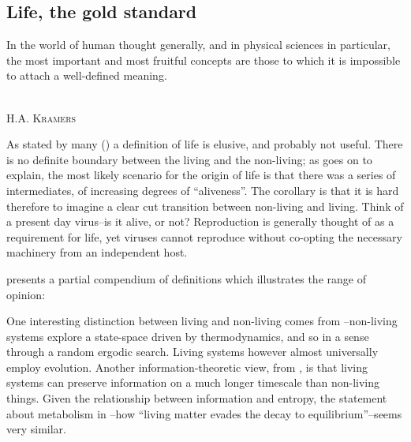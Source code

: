 \subsection{Life, the gold standard}

\epigraph{%
In the world of human thought generally, and in physical sciences in particular, the most important and most fruitful concepts are those to which it is impossible to attach a well-defined meaning.}%
{\textsc{\\H.A. Kramers}}


As stated by many (\eg \autocite{Pascal2013}) a definition of life is elusive, and probably not useful. There is no definite boundary between the living and the non-living; as \autocite{Pascal2013} goes on to explain, the most likely scenario for the origin of life is that there was a series of intermediates, of increasing degrees of ``aliveness''. The corollary is that it is hard therefore to imagine a clear cut transition between non-living and living. Think of a present day virus--is it alive, or not? Reproduction is generally thought of as a requirement for life, yet viruses cannot reproduce without co-opting the necessary machinery from an independent host. 

\autocite{Fernando:2007pf} presents a partial compendium of definitions which illustrates the range of opinion:


One interesting distinction between living and non-living comes from \autocite{Rasmussen2004}--non-living systems explore a state-space driven by thermodynamics, and so in a sense through a random ergodic search. Living systems however almost universally employ evolution. Another information-theoretic view, from \autocite{Adami2015}, is that living systems can preserve information on a much longer timescale than non-living things. Given the relationship between information and entropy, the statement about metabolism in \cite{Schrodinger1944}--how ``living matter evades the decay to equilibrium''--seems very similar.

